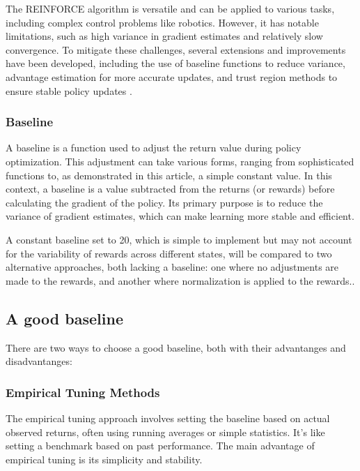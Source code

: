 \documentclass{article}
\begin{document}
The REINFORCE algorithm is versatile and can be applied to various tasks, including complex control problems like robotics. However, it has notable limitations, such as high variance in gradient estimates and relatively slow convergence. To mitigate these challenges, several extensions and improvements have been developed, including the use of baseline functions to reduce variance, advantage estimation for more accurate updates, and trust region methods to ensure stable policy updates \cite{reinforce}.


\subsubsection{Baseline}
A baseline is a function used to adjust the return value during policy optimization. This adjustment can take various forms, ranging from sophisticated functions to, as demonstrated in this article, a simple constant value. In this context, a baseline is a value subtracted from the returns (or rewards) before calculating the gradient of the policy. Its primary purpose is to reduce the variance of gradient estimates, which can make learning more stable and efficient.

A constant baseline set to 20, which is simple to implement but may not account for the variability of rewards across different states, will be compared to two alternative approaches, both lacking a baseline: one where no adjustments are made to the rewards, and another where normalization is applied to the rewards..

\subsection{A good baseline}
There are two ways to choose a good baseline, both with their advantanges and disadvantanges:

\subsubsection{Empirical Tuning Methods}
The empirical tuning approach involves setting the baseline based on actual observed returns, often using running averages or simple statistics. It's like setting a benchmark based on past performance. The main advantage of empirical tuning is its simplicity and stability.
\end{document}
